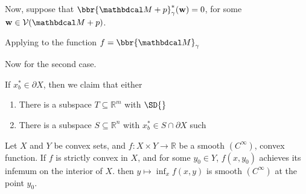 \documentclass{article}
\begin{document}
\begin{lproof}
	Now, suppose that $\bbr{\dg M \bundle p}_\gamma^*(\mat w) = 0$,  for some $\mat w \in \V(\dg M \bundle p)$.

	Applying  to the function $f = \bbr{\dg M}_\gamma$

	Now for the second case.

	\TODO

	If $x^*_b \in \partial X$, then we claim that either
	\begin{enumerate}[nosep]
		\item There is a subspace $T \subseteq \mathbb R^{m}$ with
			$\SD{}$
	 	\item There is a subspace $S \subseteq \mathbb R^{n}$ with
			$x^*_b \in S \cap \partial X$ such

	\end{enumerate}

\end{lproof}

\begin{lemma}\label{lem:cvx4}
	Let $X$ and $Y$ be convex sets, and
	$f : X \times Y \to \mathbb R$ be a smooth $(C^\infty)$, convex function.
	If $f$ is strictly convex in $X$, and for some $y_0 \in Y$, $f(x, y_0)$ achieves its infemum on the interior of $X$.
	then $y\mapsto \inf_x f(x, y)$ is smooth $(C^\infty)$ at the point $y_0$.
\end{lemma}
\end{document}
